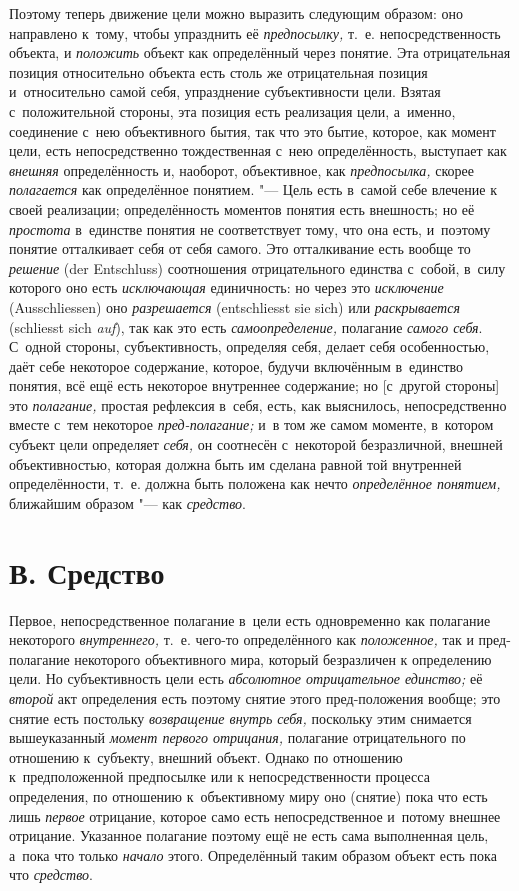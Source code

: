 Поэтому теперь движение цели можно выразить следующим образом: оно направлено
к~тому, чтобы упразднить её {\em предпосылку,} т.~е. непосредственность
объекта, и {\em положить} объект как
определённый через понятие. Эта отрицательная позиция относительно объекта
есть столь же отрицательная позиция и~относительно самой себя, упразднение
субъективности цели. Взятая с~положительной стороны, эта позиция есть
реализация цели, а~именно, соединение с~нею объективного бытия, так что это
бытие, которое, как момент цели, есть непосредственно тождественная с~нею
определённость, выступает как {\em внешняя}
определённость и, наоборот, объективное, как
{\em предпосылка,} скорее {\em полагается} как
определённое понятием. "--- Цель есть в~самой себе влечение к
своей реализации; определённость моментов понятия есть внешность; но её
{\em простота} в~единстве
понятия не соответствует тому, что она есть, и~поэтому понятие отталкивает
себя от себя самого. Это отталкивание есть вообще то
{\em решение} (der Entschluss)
соотношения отрицательного единства с~собой, в~силу которого
оно есть {\em исключающая} единичность: но через это
{\em исключение} (Aus\-schliessen) оно {\em разрешается}
(ent\-schliesst sie sich) или {\em раскрывается} (schliesst sich
{\em auf}), так как это есть {\em самоопределение,} полагание {\em самого
себя}. С~одной стороны, субъективность, определяя себя,
делает себя особенностью, даёт себе некоторое содержание, которое, будучи
включённым в~единство понятия, всё ещё есть некоторое внутреннее
содержание; но [с~другой стороны] это {\em полагание,} простая
рефлексия в~себя, есть, как выяснилось, непосредственно вместе с~тем
некоторое {\em пред-полагание;} и~в том же самом моменте, в~котором субъект
цели определяет {\em себя,} он соотнесён
с~некоторой безразличной, внешней объективностью, которая должна быть им
сделана равной той внутренней определённости, т.~е. должна быть положена как
нечто {\em определённое понятием,} ближайшим образом "--- как {\em средство}.

\section[В. Средство]{В. Средство}

Первое, непосредственное полагание в~цели есть одновременно
как полагание некоторого {\em внутреннего,} т.~е.
чего-то определённого как {\em положенное,} так и
пред-полагание некоторого объективного мира, который безразличен к
определению цели. Но субъективность цели есть
{\em абсолютное отрицательное единство;} её {\em второй} акт
определения есть поэтому снятие этого пред-положения вообще; это
снятие есть постольку {\em возвращение внутрь себя,}
поскольку этим снимается вышеуказанный {\em момент первого отрицания,}
полагание отрицательного по отношению к~субъекту, внешний
объект. Однако по отношению к~предположенной предпосылке или к
непосредственности процесса определения, по отношению к~объективному миру
оно (снятие) пока что есть лишь {\em первое} отрицание, которое само есть
непосредственное и~потому внешнее отрицание. Указанное полагание поэтому ещё
не есть сама выполненная цель, а~пока что только {\em начало} этого.
Определённый таким образом объект есть пока что {\em средство}.

